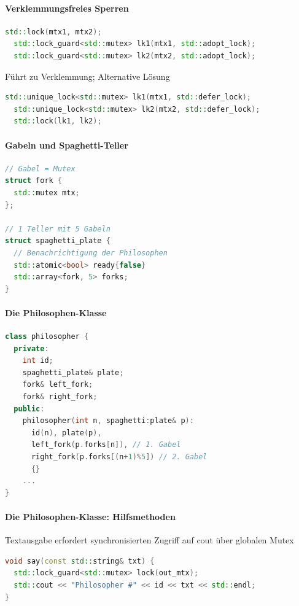 \documentclass[10pt]{article}
\begin{document}
\paragraph{Verklemmungsfreies Sperren}

\begin{lstlisting}[language=C++]
  std::lock(mtx1, mtx2);
  std::lock_guard<std::mutex> lk1(mtx1, std::adopt_lock);
  std::lock_guard<std::mutex> lk2(mtx2, std::adopt_lock);
  \end{lstlisting}
Führt zu Verklemmung; Alternative Lösung
\begin{lstlisting}[language=C++]
  std::unique_lock<std::mutex> lk1(mtx1, std::defer_lock);
  std::unique_lock<std::mutex> lk2(mtx2, std::defer_lock);
  std::lock(lk1, lk2);
  \end{lstlisting}

\paragraph{Gabeln und Spaghetti-Teller}
\begin{lstlisting}[language=C++]
// Gabel = Mutex
struct fork {
  std::mutex mtx;
};

// 1 Teller mit 5 Gabeln
struct spaghetti_plate {
  // Benachrichtigung der Philosophen
  std::atomic<bool> ready{false}
  std::array<fork, 5> forks;
}
\end{lstlisting}

\paragraph{Die Philosophen-Klasse}
\begin{lstlisting}[language=C++]
class philosopher {
  private:
    int id;
    spaghetti_plate& plate;
    fork& left_fork;
    fork& right_fork;
  public:
    philosopher(int n, spaghetti:plate& p):
      id(n), plate(p), 
      left_fork(p.forks[n]), // 1. Gabel
      right_fork(p.forks[(n+1)%5]) // 2. Gabel
      {}
    ... 
}
\end{lstlisting}

\paragraph{Die Philosophen-Klasse: Hilfsmethoden}

Textausgabe erfordert synchronisierten Zugriff auf cout über globalen Mutex
\begin{lstlisting}[language=C++]
void say(const std::string& txt) {
  std::lock_guard<std::mutex> lock(out_mtx);
  std::cout << "Philosopher #" << id << txt << std::endl;
}
\end{lstlisting}
\end{document}
